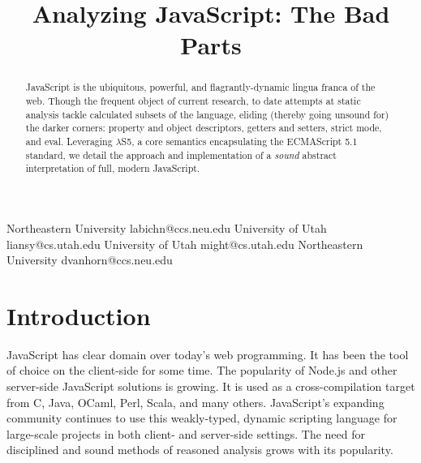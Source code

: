 \documentclass[preprint,9pt]{sigplanconf} %
\begin{document}
\copyrightdata{[to be supplied]}


\title{Analyzing JavaScript: The Bad Parts}

           {Northeastern University}
           {labichn@ccs.neu.edu}
           {University of Utah}
           {liansy@cs.utah.edu}
           {University of Utah}
           {might@cs.utah.edu}
           {Northeastern University}
           {dvanhorn@ccs.neu.edu}

\maketitle


\begin{abstract}
JavaScript is the ubiquitous, powerful, and flagrantly-dynamic lingua
franca of the web. Though the frequent object of current research, to
date attempts at static analysis tackle calculated subsets of the
language, eliding (thereby going unsound for) the darker corners:
property and object descriptors, getters and setters, strict mode,
and eval. Leveraging $\lambda$S5, a core semantics encapsulating the
ECMAScript 5.1 standard, we detail the approach and implementation of
a \emph{sound} abstract interpretation of full, modern JavaScript.
\end{abstract}

\section{Introduction}
JavaScript has clear domain over today's web programming. It has been
the tool of choice on the client-side for some time. The popularity of
Node.js and other server-side JavaScript solutions is growing. It is
used as a cross-compilation target from C, Java, OCaml, Perl, Scala,
and many others. JavaScript's expanding community continues to use
this weakly-typed, dynamic scripting language for large-scale projects
in both client- and server-side settings. The need for disciplined and
sound methods of reasoned analysis grows with its popularity.
\end{document}
